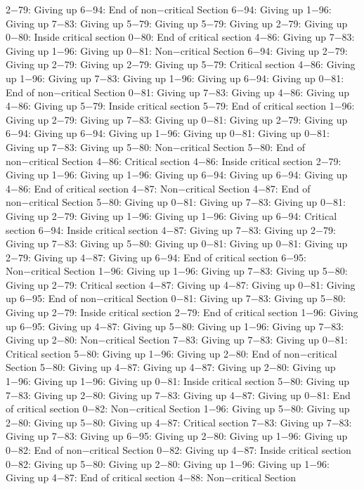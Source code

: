 2−79: Giving up
6−94: End of non−critical Section
6−94: Giving up
1−96: Giving up
7−83: Giving up
5−79: Giving up
5−79: Giving up
2−79: Giving up
0−80: Inside critical section
0−80: End of critical section
4−86: Giving up
7−83: Giving up
1−96: Giving up
0−81: Non−critical Section
6−94: Giving up
2−79: Giving up
2−79: Giving up
2−79: Giving up
5−79: Critical section
4−86: Giving up
1−96: Giving up
7−83: Giving up
1−96: Giving up
6−94: Giving up
0−81: End of non−critical Section
0−81: Giving up
7−83: Giving up
4−86: Giving up
4−86: Giving up
5−79: Inside critical section
5−79: End of critical section
1−96: Giving up
2−79: Giving up
7−83: Giving up
0−81: Giving up
2−79: Giving up
6−94: Giving up
6−94: Giving up
1−96: Giving up
0−81: Giving up
0−81: Giving up
7−83: Giving up
5−80: Non−critical Section
5−80: End of non−critical Section
4−86: Critical section
4−86: Inside critical section
2−79: Giving up
1−96: Giving up
1−96: Giving up
6−94: Giving up
6−94: Giving up
4−86: End of critical section
4−87: Non−critical Section
4−87: End of non−critical Section
5−80: Giving up
0−81: Giving up
7−83: Giving up
0−81: Giving up
2−79: Giving up
1−96: Giving up
1−96: Giving up
6−94: Critical section
6−94: Inside critical section
4−87: Giving up
7−83: Giving up
2−79: Giving up
7−83: Giving up
5−80: Giving up
0−81: Giving up
0−81: Giving up
2−79: Giving up
4−87: Giving up
6−94: End of critical section
6−95: Non−critical Section
1−96: Giving up
1−96: Giving up
7−83: Giving up
5−80: Giving up
2−79: Critical section
4−87: Giving up
4−87: Giving up
0−81: Giving up
6−95: End of non−critical Section
0−81: Giving up
7−83: Giving up
5−80: Giving up
2−79: Inside critical section
2−79: End of critical section
1−96: Giving up
6−95: Giving up
4−87: Giving up
5−80: Giving up
1−96: Giving up
7−83: Giving up
2−80: Non−critical Section
7−83: Giving up
7−83: Giving up
0−81: Critical section
5−80: Giving up
1−96: Giving up
2−80: End of non−critical Section
5−80: Giving up
4−87: Giving up
4−87: Giving up
2−80: Giving up
1−96: Giving up
1−96: Giving up
0−81: Inside critical section
5−80: Giving up
7−83: Giving up
2−80: Giving up
7−83: Giving up
4−87: Giving up
0−81: End of critical section
0−82: Non−critical Section
1−96: Giving up
5−80: Giving up
2−80: Giving up
5−80: Giving up
4−87: Critical section
7−83: Giving up
7−83: Giving up
7−83: Giving up
6−95: Giving up
2−80: Giving up
1−96: Giving up
0−82: End of non−critical Section
0−82: Giving up
4−87: Inside critical section
0−82: Giving up
5−80: Giving up
2−80: Giving up
1−96: Giving up
1−96: Giving up
4−87: End of critical section
4−88: Non−critical Section
